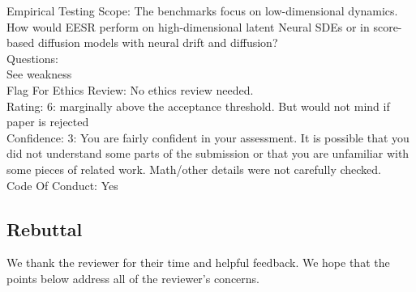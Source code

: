 \documentclass{article}
\begin{document}
Empirical Testing Scope: The benchmarks focus on low-dimensional dynamics. How would EESR perform on high-dimensional latent Neural SDEs or in score-based diffusion models with neural drift and diffusion?\\

Questions:\\
See weakness\\

Flag For Ethics Review: No ethics review needed.\\
Rating: 6: marginally above the acceptance threshold. But would not mind if paper is rejected\\
Confidence: 3: You are fairly confident in your assessment. It is possible that you did not understand some parts of the submission or that you are unfamiliar with some pieces of related work. Math/other details were not carefully checked.\\
Code Of Conduct: Yes\\

\subsection{Rebuttal}

We thank the reviewer for their time and helpful feedback. We hope that the points below address all of the reviewer's concerns.
\end{document}
